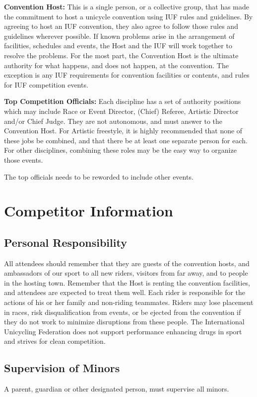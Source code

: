 \textbf{Convention Host:} This is a single person, or a collective group, that has made the commitment to host a unicycle convention using IUF rules and guidelines.
By agreeing to host an IUF convention, they also agree to follow those rules and guidelines wherever possible.
If known problems arise in the arrangement of facilities, schedules and events, the Host and the IUF will work together to resolve the problems.
For the most part, the Convention Host is the ultimate authority for what happens, and does not happen, at the convention.
The exception is any IUF requirements for convention facilities or contents, and rules for IUF competition events.

\textbf{Top Competition Officials:} Each discipline has a set of authority positions which may include Race or Event Director, (Chief) Referee, Artistic Director and/or Chief Judge.
They are not autonomous, and must answer to the Convention Host.
For Artistic freestyle, it is highly recommended that none of these jobs be combined, and that there be at least one separate person for each.
For other disciplines, combining these roles may be the easy way to organize those events.

\begin{comment2016}
The top officials needs to be reworded to include other events.
\end{comment2016}

\chapter{Competitor Information}

\section{Personal Responsibility}
All attendees should remember that they are guests of the convention hosts, and ambassadors of our sport to all new riders, visitors from far away, and to people in the hosting town.
Remember that the Host is renting the convention facilities, and attendees are expected to treat them well.
Each rider is responsible for the actions of his or her family and non-riding teammates.
Riders may lose placement in races, risk disqualification from events, or be ejected from the convention if they do not work to minimize disruptions from these people.
The International Unicycling Federation does not support performance enhancing drugs in sport and strives for clean competition.

\section{Supervision of Minors}
A parent, guardian or other designated person, must supervise all minors.

